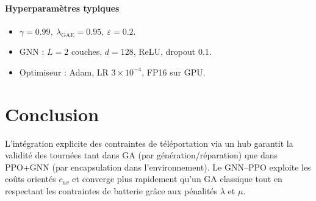 \documentclass[11pt,a4paper]{article}
\begin{document}
\paragraph{Hyperparamètres typiques}
\begin{itemize}
  \item \(\gamma=0.99,\ \lambda_{\text{GAE}}=0.95,\ \varepsilon=0.2\).
  \item GNN : \(L=2\) couches, \(d=128\), ReLU, dropout \(0.1\).
  \item Optimiseur : Adam, LR \(3\times10^{-4}\), FP16 sur GPU.
\end{itemize}

\section{Conclusion}
L’intégration explicite des contraintes de téléportation via un hub garantit la validité des tournées tant dans GA (par génération/réparation) que dans PPO+GNN (par encapsulation dans l’environnement). Le GNN–PPO exploite les coûts orientés \(c_{uv}\) et converge plus rapidement qu’un GA classique tout en respectant les contraintes de batterie grâce aux pénalités \(\lambda\) et \(\mu\).
\end{document}
